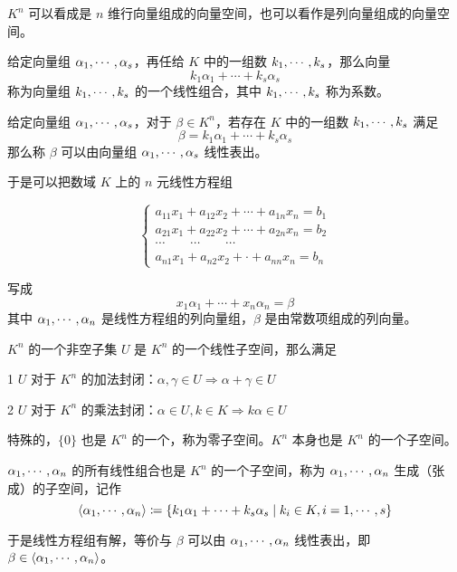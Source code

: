 $K^n$ 可以看成是 $n$ 维行向量组成的向量空间，也可以看作是列向量组成的向量空间。

\begin{definition}[线性组合]
	给定向量组 $\alpha_1,\cdots,\alpha_s$，再任给 $K$ 中的一组数 $k_1,\cdots,k_s$，那么向量
	\[k_1 \alpha_1+\cdots+k_s \alpha_s\]
	称为向量组 $k_1,\cdots,k_s$ 的一个线性组合，其中 $k_1,\cdots,k_s$ 称为系数。
\end{definition}

\begin{definition}[线性表出]
	给定向量组 $\alpha_1,\cdots,\alpha_s$，对于 $\beta \in K^n$，若存在 $K$ 中的一组数 $k_1,\cdots,k_s$ 满足
	\[\beta = k_1\alpha_1+\cdots+k_s\alpha_s\]
	那么称 $\beta$ 可以由向量组 $\alpha_1,\cdots,\alpha_s$ 线性表出。
\end{definition}

于是可以把数域 $K$ 上的 $n$ 元线性方程组

\begin{equation*}
	\left\{
		\begin{matrix}
			a_{11}x_1+a_{12}x_2+\cdots+a_{1n}x_n=b_1\\
			a_{21}x_1+a_{22}x_2+\cdots+a_{2n}x_n=b_2\\
			\cdots\qquad\cdots\qquad\cdots\\
			a_{n1}x_1+a_{n2}x_2+\cdot +a_{nn}x_n=b_n
		\end{matrix}
	\right.
\end{equation*}

写成
\[x_1\alpha_1+\cdots+x_n\alpha_n=\beta\]
其中 $\alpha_1,\cdots,\alpha_n$ 是线性方程组的列向量组，$\beta$ 是由常数项组成的列向量。

\begin{definition}[线性子空间]
	$K^n$ 的一个非空子集 $U$ 是 $K^n$ 的一个线性子空间，那么满足
	
	\num{1} $U$ 对于 $K^n$ 的加法封闭：$\alpha,\gamma\in U \Rightarrow \alpha+\gamma \in U$

	\num{2} $U$ 对于 $K^n$ 的乘法封闭：$\alpha \in U,k\in K \Rightarrow k\alpha \in U$
\end{definition}

特殊的，$\{0\}$ 也是 $K^n$ 的一个，称为零子空间。$K^n$ 本身也是 $K^n$ 的一个子空间。

$\alpha_1,\cdots,\alpha_n$ 的所有线性组合也是 $K^n$ 的一个子空间，称为 $\alpha_1,\cdots,\alpha_n$ 生成（张成）的子空间，记作
\[\langle \alpha_1,\cdots,\alpha_n\rangle\coloneqq \{k_1\alpha_1+\cdots+k_s\alpha_s \mid k_i\in K,i=1,\cdots,s\}\]

于是线性方程组有解，等价与 $\beta$ 可以由 $\alpha_1,\cdots,\alpha_n$ 线性表出，即 $\beta \in \langle\alpha_1,\cdots,\alpha_n\rangle$。

